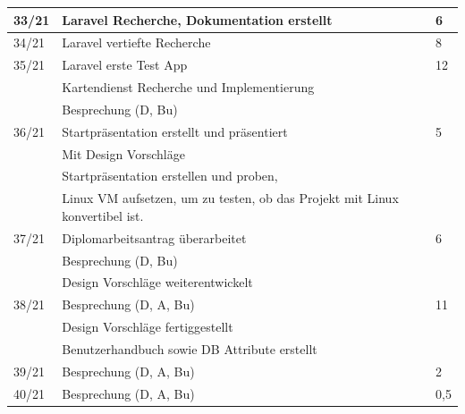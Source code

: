 \begin{table}[h]
\begin{tabular}{|l|lll|}
		33/21 &
		\multicolumn{2}{l|}{Laravel Recherche, Dokumentation erstellt} &
		6 \\ \hline
		34/21 &
		\multicolumn{2}{l|}{Laravel vertiefte Recherche} &
		8 \\ \hline
		35/21 &
		\multicolumn{2}{l|}{Laravel erste Test App} &
		12 \\ &Kartendienst Recherche und Implementierung  \\ &Besprechung (D, Bu)\\ \hline
		36/21 &
		\multicolumn{2}{l|}{Startpräsentation erstellt und präsentiert } &
		5\\&Mit Design Vorschläge\\ 
		&Startpräsentation erstellen und proben,\\ & Linux VM aufsetzen, um zu testen, ob das Projekt mit Linux konvertibel ist.\\\hline
		37/21 &
		\multicolumn{2}{l|}{Diplomarbeitsantrag überarbeitet} &
		6 \\ & Besprechung (D, Bu)\\    & Design Vorschläge weiterentwickelt\\      \hline
		38/21 &
		\multicolumn{2}{l|}{Besprechung (D, A, Bu)  } &
		11 \\ &Design Vorschläge fertiggestellt \\&Benutzerhandbuch sowie DB Attribute erstellt\\          \hline
		39/21 &
		\multicolumn{2}{l|}{Besprechung (D, A, Bu)} &
		2 \\ \hline
		40/21 &
		\multicolumn{2}{l|}{Besprechung (D, A, Bu)} &
		0,5 \\ \hline
		
		
	\end{tabular}
\end{table}
\newpage
